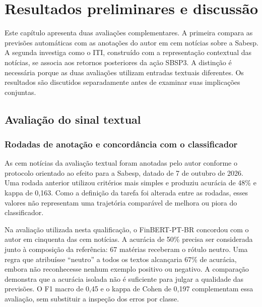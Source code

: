 \chapter{Resultados preliminares e discussão}
\label{cap:resultados}

Este capítulo apresenta duas avaliações complementares. A primeira compara as previsões automáticas com as anotações do autor em cem notícias sobre a Sabesp. A segunda investiga como o ITI, construído com a representação contextual das notícias, se associa aos retornos posteriores da ação SBSP3. A distinção é necessária porque as duas avaliações utilizam entradas textuais diferentes. Os resultados são discutidos separadamente antes de examinar suas implicações conjuntas.

\section{Avaliação do sinal textual}

\subsection{Rodadas de anotação e concordância com o classificador}

As cem notícias da avaliação textual foram anotadas pelo autor conforme o protocolo orientado ao efeito para a Sabesp, datado de 7 de outubro de 2026. Uma rodada anterior utilizou critérios mais simples e produziu acurácia de 48\% e kappa de 0,163. Como a definição da tarefa foi alterada entre as rodadas, esses valores não representam uma trajetória comparável de melhora ou piora do classificador.

Na avaliação utilizada nesta qualificação, o FinBERT-PT-BR concordou com o autor em cinquenta das cem notícias. A acurácia de 50\% precisa ser considerada junto à composição da referência: 67 matérias receberam o rótulo neutro. Uma regra que atribuísse ``neutro'' a todos os textos alcançaria 67\% de acurácia, embora não reconhecesse nenhum exemplo positivo ou negativo. A comparação demonstra que a acurácia isolada não é suficiente para julgar a qualidade das previsões. O F1 macro de 0,45 e o kappa de Cohen de 0,197 complementam essa avaliação, sem substituir a inspeção dos erros por classe.

